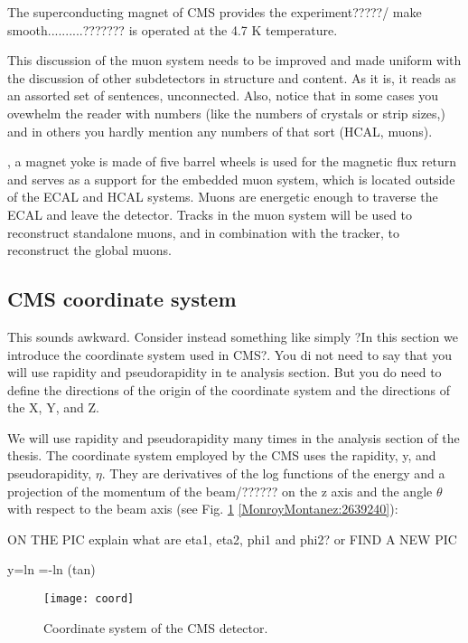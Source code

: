 The superconducting magnet of CMS provides the experiment?????/ make smooth..........??????? is operated at the 4.7 K temperature. 



This discussion of the muon system needs to be improved and made uniform with the discussion of other subdetectors in structure and content. As it is, it reads as an assorted set of sentences, unconnected.
  Also, notice that in some cases you ovewhelm the reader with numbers (like the numbers of crystals or strip sizes,) and in others you hardly mention any numbers of that sort (HCAL, muons). 
  
  
  , a magnet yoke is made of five barrel wheels is used for the magnetic flux return and serves as a support for the embedded muon system, which is located outside of the ECAL and HCAL systems. Muons are energetic enough to traverse the ECAL and leave the detector. Tracks in the muon system will be used to reconstruct standalone muons, and in combination with the tracker, to reconstruct the global muons.  


\subsection{CMS coordinate system}


This sounds awkward. Consider instead something like simply ?In this section we introduce the coordinate system used in CMS?. You di not need to say that you will use rapidity and pseudorapidity in te analysis section. But you do need to define the directions of the origin of the coordinate system and the directions of the X, Y, and Z. 

We will use rapidity and pseudorapidity many times in the analysis section of the thesis. The coordinate system employed by the CMS uses the rapidity, y, and pseudorapidity, $\eta$. They are derivatives of the log functions of the energy and a projection of the momentum of the beam/?????? on the z axis and the angle $\theta$ with respect to the beam axis (see Fig. \ref{coord} \ref{MonroyMontanez:2639240}):


ON THE PIC explain what are eta1, eta2, phi1 and phi2? or FIND A NEW PIC


\beqn
y=ln \qquad \eta=-ln \left(tan\right)
\label{eqn:eta}
\eeqn


\begin{figure}[h!]
  \centering
  \texttt{[image: coord]}
  \caption[Coordinate system of the CMS detector]{Coordinate system of the CMS detector.}
  \label{coord}
\end{figure}


